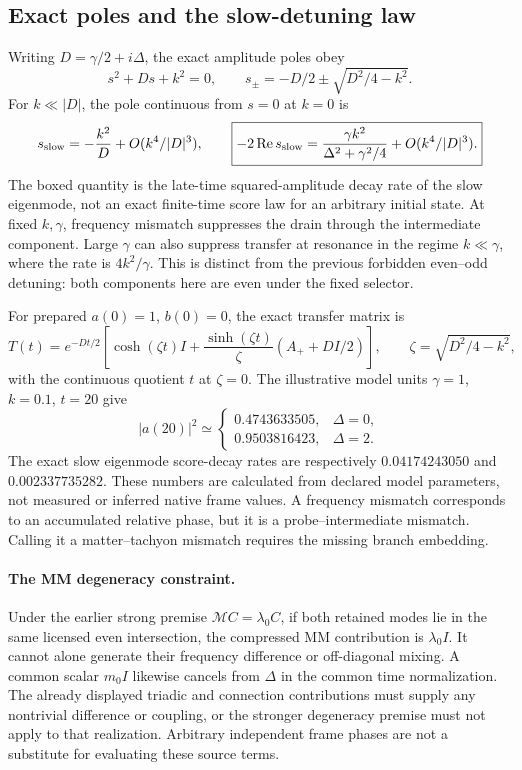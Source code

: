 \documentclass[11pt,a4paper]{article}
\begin{document}
\subsection{Exact poles and the slow-detuning law}

Writing $D=\gamma/2+i\Delta$, the exact amplitude poles obey
\[
 s^2+Ds+k^2=0,\qquad
 s_\pm=-D/2\pm\sqrt{D^2/4-k^2}.
\]
For $k\ll|D|$, the pole continuous from $s=0$ at $k=0$ is
\[
 s_{\rm slow}=-\frac{k^2}{D}+O(k^4/|D|^3),\qquad
 \boxed{\displaystyle
 -2\operatorname{Re}s_{\rm slow}
  =\frac{\gamma k^2}{\Delta^2+\gamma^2/4}
      +O(k^4/|D|^3).}
\]
The boxed quantity is the late-time squared-amplitude decay rate
of the slow eigenmode, not an exact finite-time score law for an
arbitrary initial state. At fixed $k,\gamma$, frequency mismatch
suppresses the drain through the intermediate component. Large
$\gamma$ can also suppress transfer at resonance in the regime
$k\ll\gamma$, where the rate is $4k^2/\gamma$.
This is distinct from the previous forbidden even--odd detuning:
both components here are even under the fixed selector.

For prepared $a(0)=1$, $b(0)=0$, the exact transfer matrix is
\[
 T(t)=e^{-Dt/2}\left[
 \cosh(\zeta t)I+
 \frac{\sinh(\zeta t)}{\zeta}(A_++D I/2)\right],
 \qquad \zeta=\sqrt{D^2/4-k^2},
\]
with the continuous quotient $t$ at $\zeta=0$. The illustrative
model units $\gamma=1$, $k=0.1$, $t=20$ give
\[
 |a(20)|^2\simeq
 \begin{cases}
 0.4743633505,&\Delta=0,\\
 0.9503816423,&\Delta=2.
 \end{cases}
\]
The exact slow eigenmode score-decay rates are respectively
$0.04174243050$ and $0.002337735282$. These numbers are calculated
from declared model parameters, not measured or inferred native
frame values. A frequency mismatch corresponds to an accumulated
relative phase, but it is a probe--intermediate mismatch. Calling
it a matter--tachyon mismatch requires the missing branch embedding.

\paragraph{The MM degeneracy constraint.}
Under the earlier strong premise $\mathcal M C=\lambda_0 C$, if
both retained modes lie in the same licensed even intersection,
the compressed MM contribution is $\lambda_0 I$. It cannot alone
generate their frequency difference or off-diagonal mixing.
A common scalar $m_0 I$ likewise cancels from $\Delta$ in the
common time normalization. The already displayed triadic and
connection contributions must supply any nontrivial difference
or coupling, or the stronger degeneracy premise must not apply
to that realization. Arbitrary independent frame phases are not
a substitute for evaluating these source terms.
\end{document}
